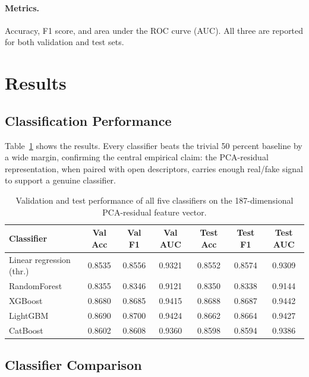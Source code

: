 \documentclass[runningheads]{llncs}
\begin{document}
\paragraph{Metrics.} Accuracy, F1 score, and area under the ROC curve (AUC). All three are reported for both validation and test sets.


\section{Results}

\subsection{Classification Performance}

Table~\ref{tab:results} shows the results. Every classifier beats the trivial 50 percent baseline by a wide margin, confirming the central empirical claim: the PCA-residual representation, when paired with open descriptors, carries enough real/fake signal to support a genuine classifier.

\begin{table}[t]
\centering
\caption{Validation and test performance of all five classifiers on the 187-dimensional PCA-residual feature vector.}
\label{tab:results}
\small
\begin{tabular}{@{}lcccccc@{}}
\toprule
Classifier & Val Acc & Val F1 & Val AUC & Test Acc & Test F1 & Test AUC \\
\midrule
Linear regression (thr.)  & 0.8535 & 0.8556 & 0.9321 & 0.8552 & 0.8574 & 0.9309 \\
RandomForest              & 0.8355 & 0.8346 & 0.9121 & 0.8350 & 0.8338 & 0.9144 \\
XGBoost                   & 0.8680 & 0.8685 & 0.9415 & 0.8688 & 0.8687 & 0.9442 \\
LightGBM                  & 0.8690 & 0.8700 & 0.9424 & 0.8662 & 0.8664 & 0.9427 \\
CatBoost                  & 0.8602 & 0.8608 & 0.9360 & 0.8598 & 0.8594 & 0.9386 \\
\bottomrule
\end{tabular}
\end{table}


\subsection{Classifier Comparison}
\end{document}

